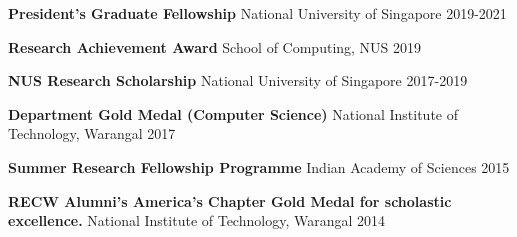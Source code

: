



\begin{cvhonors}

  \cvhonor
    {\textbf{President's Graduate Fellowship}} %
    {National University of Singapore} %
    {} %
    {2019-2021} %
    
  \cvhonor
    {\textbf{Research Achievement Award}} %
    {School of Computing, NUS} %
    {} %
    {2019} %

  \cvhonor
    {\textbf{NUS Research Scholarship}} %
    {National University of Singapore} %
    {} %
    {2017-2019} %

  \cvhonor
    {\textbf{Department Gold Medal (Computer Science) }} %
    {National Institute of Technology, Warangal} %
    {} %
    {2017} %

  \cvhonor
    {\textbf{Summer Research Fellowship Programme}} %
    {Indian Academy of Sciences} %
    {} %
    {2015} %

  \cvhonor
    {\textbf{RECW Alumni's America's Chapter Gold Medal for scholastic excellence.}} %
    {National Institute of Technology, Warangal} %
    {} %
    {2014} %


\end{cvhonors}
